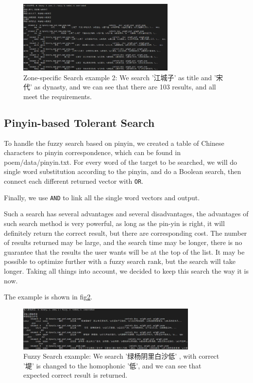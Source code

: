 \begin{figure}[h]
\centering
\includegraphics[width=0.7\textwidth]{figure/zone-2-103.png}
\caption{Zone-specific Search example 2: We search '江城子' as title and '宋代' as dynasty, and we can see that there are 103 results, and all meet the requirements.}
\label{search-6}
\end{figure}



\subsection{Pinyin-based Tolerant Search}

To handle the fuzzy search based on pinyin, we created a table of Chinese characters to pinyin correspondence, which can be found in poem/data/pinyin.txt. For every word of the target to be searched, we will do single word substitution according to the pinyin, and  do a Boolean search, then connect each different returned vector with \lstinline{OR}.

Finally, we use \lstinline{AND} to link all the single word vectors and output.

Such a search has several advantages and several disadvantages, the advantages of such search method is very powerful, as long as the pin-yin is right, it will definitely return the correct result, but there are corresponding cost. The number of results returned may be large, and the search time may be longer, there is no guarantee that the results the user wants will be at the top of the list. It may be possible to optimize further with a fuzzy search rank, but the search will take longer. Taking all things into account, we decided to keep this search the way it is now.

The example is shown in fig\ref{search-7}.


\begin{figure}[h]
\centering
\includegraphics[width=0.8\textwidth]{figure/fuzzy-example.png}
\caption{Fuzzy Search example: We search '绿杨阴里白沙低' , with correct '堤' is changed to the homophonic '低', and we can see that expected correct result is returned.}
\label{search-7}
\end{figure}

